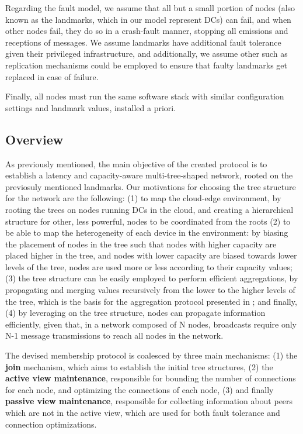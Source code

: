 Regarding the fault model, we assume that all but a small portion of nodes (also known as the landmarks, which in our model represent DCs) can fail, and when other nodes fail, they do so in a crash-fault manner, stopping all emissions and receptions of messages. We assume landmarks have additional fault tolerance given their privileged infrastructure, and additionally, we assume other such as replication \cite{} mechanisms could be employed to ensure that faulty landmarks get replaced in case of failure. 
  
Finally, all nodes must run the same software stack with similar configuration settings and landmark values, installed a priori.

\subsection{Overview}

As previously mentioned, the main objective of the created protocol is to establish a latency and capacity-aware multi-tree-shaped network, rooted on the previosuly mentioned landmarks. Our motivations for choosing the tree structure for the network are the following: (1) to map the cloud-edge environment, by rooting the trees on nodes running DCs in the cloud, and creating a hierarchical structure for other, less powerful, nodes to be coordinated from the roots  (2) to be able to map the heterogeneity of each device in the environment: by biasing the placement of nodes in the tree such that nodes with higher capacity are placed higher in the tree, and nodes with lower capacity are biased towards lower levels of the tree, nodes are used more or less according to their capacity values; (3) the tree structure can be easily employed to perform efficient aggregations, by propagating and merging values recursively from the lower to the higher levels of the tree, which is the basis for the aggregation protocol presented in ; and finally, (4) by leveraging on the tree structure, nodes can propagate information efficiently, given that, in a network composed of N nodes, broadcasts require only N-1 message transmissions to reach all nodes in the network. 


The devised membership protocol is coalesced by three main mechanisms: (1) the \textbf{join} mechanism, which aims to establish the initial tree structures, (2) the \textbf{active view maintenance}, responsible for bounding the number of connections for each node, and optimizing the connections of each node, (3)  and finally \textbf{passive view maintenance}, responsible for collecting information about peers which are not in the active view, which are used for both fault tolerance and connection optimizations.


